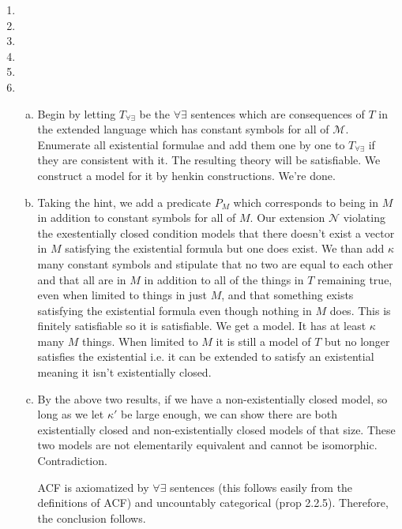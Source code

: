 \documentclass[10pt]{article}
\newcommand{\A}{\forall}
\newcommand{\mcM}{\mathcal{M}}
\newcommand{\mcN}{\mathcal{N}}
\newcommand{\E}{\exists}
\begin{document}
\begin{enumerate}[1.]
\item
 
\item
 
\item
 
\item

\item
 
\item 
  \begin{enumerate}[a)]
  \item Begin by letting \(T_{\A\E}\) be the \(\A\E\) sentences which are consequences of \(T\) in the extended language which has constant symbols for all of \(\mcM\). 
Enumerate all existential formulae and add them one by one to \(T_{\A\E}\) if they are consistent with it. 
The resulting theory will be satisfiable. 
We construct a model for it by henkin constructions. We're done. 

  \item Taking the hint, we add a predicate \(P_M\) which corresponds to being in \(M\) in addition to constant symbols for all of \(M\). 
Our extension \(\mcN\) violating the exestentially closed condition models that there doesn't exist a vector in \(M\) satisfying the existential formula but one does exist. We than add \(\kappa\) many constant symbols and stipulate that no two are equal to each other and that all are in \(M\) in addition to all of the things in \(T\) remaining true, even when limited to things in just \(M\), and that something exists satisfying the existential formula even though nothing in \(M\) does. 
This is finitely satisfiable so it is satisfiable. We get a model. It has at least \(\kappa\) many \(M\) things. 
When limited to \(M\) it is still a model of \(T\) but no longer satisfies the existential i.e. it can be extended to satisfy an existential meaning it isn't existentially closed.   

  \item By the above two results, if we have a non-existentially closed model,  so long as we let \(\kappa'\) be large enough, we can show there are both existentially closed and non-existentially closed models of that size. These two models are not elementarily equivalent and cannot be isomorphic. Contradiction. 

ACF is axiomatized by \(\A\E\) sentences (this follows easily from the definitions of ACF) and uncountably categorical (prop 2.2.5). Therefore, the conclusion follows. 


\end{enumerate}
\end{enumerate}
\end{document}
